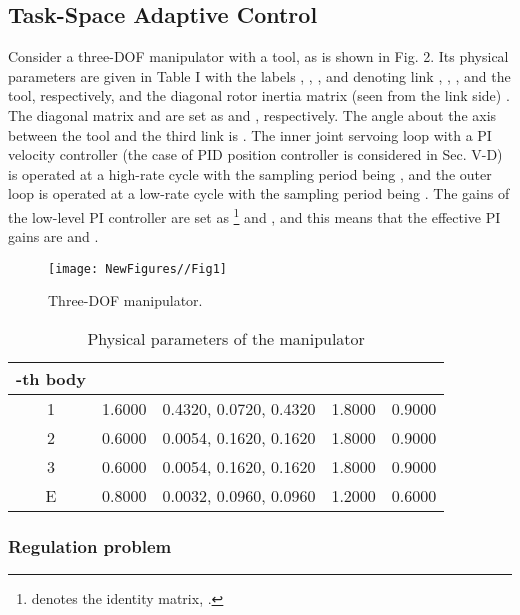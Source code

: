 \documentclass[9pt,technote]{IEEEtran}
\begin{document}
{\subsection{Task-Space Adaptive Control}

Consider a three-DOF manipulator with a tool, as is shown in Fig. 2. Its physical parameters are given in Table I with the labels , , , and  denoting link , , , and the tool, respectively, and the diagonal rotor inertia matrix (seen from the link side) . The diagonal matrix  and  are set as  and , respectively. The angle about the axis  between the tool and the third link is . The inner joint servoing loop with a PI velocity controller (the case of PID position controller is considered in Sec. V-D) is operated at a high-rate cycle with the sampling period being , and the outer loop is operated at a low-rate cycle with the sampling period being . The gains of the low-level PI controller are set as \footnote{ denotes the   identity matrix, .} and , and this means that the effective PI gains are  and .

\begin{figure}
\centering
\begin{minipage}[t]{1.0\linewidth}
\centering
\texttt{[image: NewFigures//Fig1]}
\caption{Three-DOF manipulator.}
\end{minipage}\end{figure}



\begin{table}[!t]
\renewcommand{\arraystretch}{1.5}
\center\caption{Physical parameters of the manipulator}
\begin{tabular}{c c c c c}
\hline
 -th body && && \\
\hline
1& 1.6000 &   0.4320,   0.0720,  0.4320 &   1.8000&    0.9000 \\
\hline
2& 0.6000&    0.0054,    0.1620,    0.1620 &  1.8000&  0.9000 \\
\hline
3& 0.6000&   0.0054,   0.1620,    0.1620 &   1.8000 &   0.9000 \\
\hline
E&
0.8000&    0.0032,    0.0960,    0.0960&    1.2000&    0.6000 \\
\hline
\end{tabular}
\label{Tab1}
\end{table}

\subsubsection{Regulation problem}

}
\end{document}
